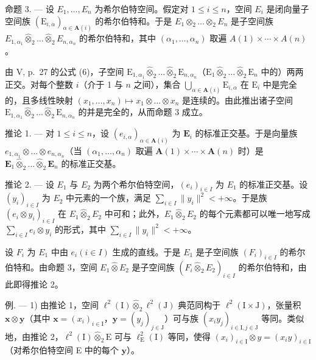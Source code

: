命题 3. --- 设 \(E_{1}, \ldots, E_{n}\) 为希尔伯特空间。假定对 \(1 \leqslant i \leqslant n\)，空间 \(E_{i}\) 是闭向量子空间族 \((\mathrm{E}_{i,\alpha})_{\alpha \in \mathbf{A}(i)}\) 的希尔伯特和。于是 \(E_{1} \otimes_{2} \ldots \otimes_{2} E_{n}\) 是子空间族 \(E_{1,\alpha_{1}} \hat{\otimes}_{2} \ldots \hat{\otimes}_{2} E_{n,\alpha_{n}}\) 的希尔伯特和，其中 \((\alpha_{1}, \ldots, \alpha_{n})\) 取遍 \(A(1) \times \cdots \times A(n)\)。

由 V, p.~27 的公式 (6)，子空间 \(\mathrm{E}_{1,\alpha_1}\hat{\otimes}_2\ldots \hat{\otimes}_2\mathrm{E}_{n,\alpha_n}\)（\(\mathrm{E}_1\hat{\otimes}_2\ldots \hat{\otimes}_2\mathrm{E}_n\) 中的）两两正交。对每个整数 \(i\)（介于 1 与 \(n\) 之间），集合 \(\bigcup_{\alpha \in \mathbf{A}(i)}\mathrm{E}_{i,\alpha}\) 在 \(\mathrm{E}_i\) 中是完全的，且多线性映射 \((x_{1},\dots,x_{n})\mapsto x_{1}\otimes \dots \otimes x_{n}\) 是连续的。由此推出诸子空间 \(\mathrm{E}_{1,\alpha_1}\hat{\otimes}_2\ldots \hat{\otimes}_2\mathrm{E}_{n,\alpha_n}\) 的并是完全的，从而命题 3 成立。

推论 1. --- 对 \(1 \leqslant i \leqslant n\)，设 \((e_{i,\alpha})_{\alpha \in \mathbf{A}(i)}\) 为 \(\mathbf{E}_i\) 的标准正交基。于是向量族 \(e_{1,\alpha_1} \otimes \ldots \otimes e_{n,\alpha_n}\)（当 \((\alpha_1, \ldots, \alpha_n)\) 取遍 \(\mathbf{A}(1) \times \cdots \times \mathbf{A}(n)\) 时）是 \(\mathbf{E}_1 \hat{\otimes}_2 \ldots \hat{\otimes}_2 \mathbf{E}_n\) 的标准正交基。

推论 2. --- 设 \(E_{1}\) 与 \(E_{2}\) 为两个希尔伯特空间，\((e_{i})_{i\in I}\) 为 \(E_{1}\) 的标准正交基。设 \((y_{i})_{i\in I}\) 为 \(E_{2}\) 中元素的一个族，满足 \(\sum_{i\in I}\|y_{i}\|^{2}<+\infty\)。于是族 \((e_{i}\otimes y_{i})_{i\in I}\) 在 \(E_{1}\hat{\otimes}_{2}E_{2}\) 中可和；此外，\(E_{1}\hat{\otimes}_{2}E_{2}\) 的每个元素都可以唯一地写成 \(\sum_{i\in I}e_{i}\otimes y_{i}\) 的形式，其中 \(\sum_{i\in I}\|y_{i}\|^{2}<+\infty\)。

设 \(F_{i}\) 为 \(E_{1}\) 中由 \(e_{i} (i \in I)\) 生成的直线。于是 \(E_{1}\) 是子空间族 \((F_{i})_{i \in I}\) 的希尔伯特和。由命题 3，空间 \(E_{1} \hat{\otimes} E_{2}\) 是子空间族 \((F_{i} \hat{\otimes}_{2} E_{2})_{i \in I}\) 的希尔伯特和，由此即得推论 2。

例. --- 1) 由推论 1，空间 \(\ell^2 (\mathrm{I})\hat{\otimes}_2\ell^2 (\mathrm{J})\) 典范同构于 \(\ell^2 (\mathrm{I}\times \mathrm{J})\)，张量积 \(\mathbf{x}\otimes \mathbf{y}\)（其中 \(\mathbf{x} = (x_i)_{i\in \mathrm{I}}\)，\(\mathbf{y} = (y_j)_{j\in \mathrm{J}}\)）可与族 \((x_iy_j)_{i\in \mathrm{I},j\in \mathrm{J}}\) 等同。类似地，由推论 2，\(\ell^2 (\mathrm{I})\hat{\otimes}_2\mathrm{E}\) 可与 \(\ell_{\mathrm{E}}^{2}(\mathrm{I})\) 等同，使得 \((x_{i})_{i\in \mathrm{I}}\otimes y = (x_{i}y)_{i\in \mathrm{I}}\)（对希尔伯特空间 E 中的每个 \(\mathbf{y}\)）。

